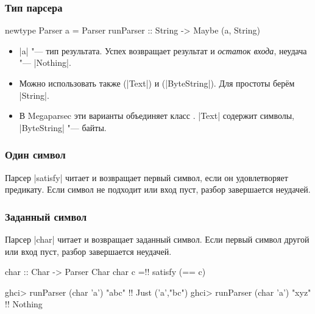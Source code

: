 \documentclass[11pt]{beamer}
\begin{document}
\begin{frame}[fragile]
  \frametitle{Тип парсера}
  \begin{haskell}
    newtype Parser a = Parser
      { runParser :: String -> Maybe (a, String) }
  \end{haskell}
  \begin{itemize}
    \item \haskinline|a| "--- тип результата. Успех возвращает результат и \emph{остаток входа}, неудача "--- \haskinline|Nothing|.
      \pause
    \item Можно использовать также  (\haskinline|Text|) и  (\haskinline|ByteString|). Для простоты берём \haskinline|String|.
    \item В Megaparsec эти варианты объединяет класс \href{https://hackage.haskell.org/package/megaparsec/docs/Text-Megaparsec-Stream.html}{}. \haskinline|Text| содержит символы, \haskinline|ByteString| "--- байты.
  \end{itemize}
\end{frame}

\begin{frame}[fragile]
  \frametitle{Один символ}
  Парсер \haskinline|satisfy| читает и возвращает первый символ, если он удовлетворяет предикату. Если символ не подходит или вход пуст, разбор завершается неудачей.
  \pause
\end{frame}

\begin{frame}[fragile]
  \frametitle{Заданный символ}
  Парсер \haskinline|char| читает и возвращает заданный символ. Если первый символ другой или вход пуст, разбор завершается неудачей.
  \pause
  \begin{haskellsmall}
    char :: Char -> Parser Char
    char c =!\pause! satisfy (== c)
  \end{haskellsmall}
  \begin{haskellsmall}
    ghci> runParser (char 'a') "abc" !\pause!
    Just ('a',"bc")
    ghci> runParser (char 'a') "xyz" !\pause!
    Nothing
  \end{haskellsmall}
\end{frame}
\end{document}
